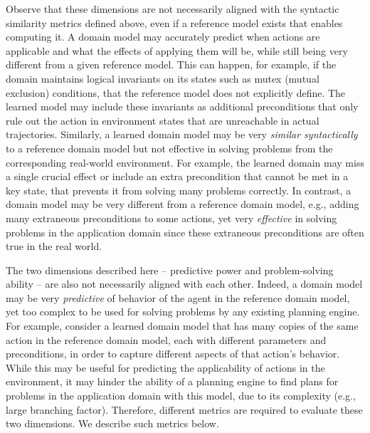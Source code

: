 \documentclass{article}
\theoremstyle{definition}
\theoremstyle{remark}
\newif\ifaddcomments
\newcommand{\roni}[1]{\ifaddcomments{\textcolor{red}{[Roni: #1]}}\fi}
\newcommand{\yarin}[1]{\ifaddcomments{\textcolor{teal}{[Yarin: #1]}}\fi}
\newcommand{\gregor}[1]{\ifaddcomments{\textcolor{orange}{[Gregor: #1]}}\fi}
\begin{document}
Observe that these dimensions are not necessarily aligned with the syntactic similarity metrics defined above, even if a reference model exists that enables computing it.  
A domain model may accurately predict when actions are applicable and what the effects of applying them will be, while still being very different from a given reference model. 
This can happen, for example, if the domain maintains logical invariants on its states such as mutex (mutual exclusion) conditions, that the reference model does not explicitly define. The learned model may include these invariants as additional preconditions that only rule out the action in environment states that are unreachable in actual trajectories.
Similarly, a learned domain model may be very \emph{similar syntactically} to a reference domain model but not effective in solving problems from the corresponding real-world environment. 
For example, the learned domain may miss a single crucial effect or include an extra precondition that cannot be met in a key state, that prevents it from solving many problems correctly. 
In contrast, a domain model may be very different from a reference domain model, e.g., adding many extraneous preconditions to some actions, yet very \emph{effective} in solving problems in the application domain since these extraneous preconditions are often true in the real world. 


The two dimensions described here -- predictive power and problem-solving ability -- are also not necessarily aligned with each other. Indeed, a domain model may be very \emph{predictive} of behavior of the agent in the reference domain model, yet too complex to be used for solving problems by any existing planning engine.
For example, consider a learned domain model that has many copies of the same action in the reference domain model, each with different parameters and preconditions, in order to capture different aspects of that action's behavior. 
While this may be useful for predicting the applicability of actions in the environment, 
it may hinder the ability of a planning engine to find plans for problems in the application domain with this model, due to its complexity (e.g., large branching factor). 
Therefore, different metrics are required to evaluate these two dimensions. We describe such metrics below. 
\end{document}
